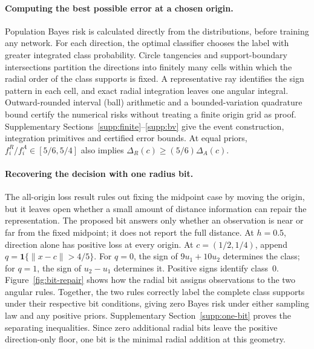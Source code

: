 \paragraph{Computing the best possible error at a chosen origin.}
Population Bayes risk is calculated directly from the distributions, before training any network. For each direction, the optimal classifier chooses the label with greater integrated class probability. Circle tangencies and support-boundary intersections partition the directions into finitely many cells within which the radial order of the class supports is fixed. A representative ray identifies the sign pattern in each cell, and exact radial integration leaves one angular integral. Outward-rounded interval (ball) arithmetic and a bounded-variation quadrature bound certify the numerical risks without treating a finite origin grid as proof. Supplementary Sections~\ref{supp:finite}--\ref{supp:bv} give the event construction, integration primitives and certified error bounds. At equal priors, $f_i^R/f_i^A\in[5/6,5/4]$ also implies $\Delta_R(c)\geq(5/6)\Delta_A(c)$.

\paragraph{Recovering the decision with one radius bit.}
The all-origin loss result rules out fixing the midpoint case by moving the origin, but it leaves open whether a small amount of distance information can repair the representation. The proposed bit answers only whether an observation is near or far from the fixed midpoint; it does not report the full distance. At $h=0.5$, direction alone has positive loss at every origin. At $c=(1/2,1/4)$, append $q=\mathbf1\{\|x-c\|>4/5\}$. For $q=0$, the sign of $9u_1+10u_2$ determines the class; for $q=1$, the sign of $u_2-u_1$ determines it. Positive signs identify class~0. Figure~\ref{fig:bit-repair} shows how the radial bit assigns observations to the two angular rules. Together, the two rules correctly label the complete class supports under their respective bit conditions, giving zero Bayes risk under either sampling law and any positive priors. Supplementary Section~\ref{supp:one-bit} proves the separating inequalities. Since zero additional radial bits leave the positive direction-only floor, one bit is the minimal radial addition at this geometry.

